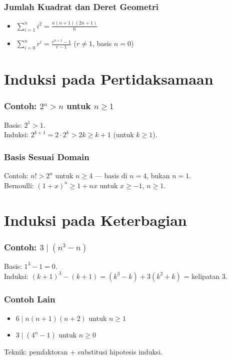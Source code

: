 \documentclass[handout]{beamer}
\theoremstyle{definition}
\theoremstyle{example}
\begin{document}
\begin{frame}
\frametitle{Jumlah Kuadrat dan Deret Geometri}
\begin{itemize}
  \item $\displaystyle\sum_{i=1}^{n} i^2 = \frac{n(n+1)(2n+1)}{6}$
  \item $\displaystyle\sum_{i=0}^{n} r^i = \frac{r^{n+1}-1}{r-1}$ ($r \neq 1$, basis $n=0$)
\end{itemize}
\end{frame}

\section{Induksi pada Pertidaksamaan}

\begin{frame}
\frametitle{Contoh: $2^n > n$ untuk $n \geq 1$}
Basis: $2^1 > 1$.\\
Induksi: $2^{k+1} = 2 \cdot 2^k > 2k \geq k+1$ (untuk $k \geq 1$).
\end{frame}

\begin{frame}
\frametitle{Basis Sesuai Domain}
Contoh: $n! > 2^n$ untuk $n \geq 4$ --- basis di $n=4$, bukan $n=1$.\\
Bernoulli: $(1+x)^n \geq 1+nx$ untuk $x \geq -1$, $n \geq 1$.
\end{frame}

\section{Induksi pada Keterbagian}

\begin{frame}
\frametitle{Contoh: $3 \mid (n^3 - n)$}
Basis: $1^3-1=0$.\\
Induksi: $(k+1)^3-(k+1) = (k^3-k) + 3(k^2+k)$ = kelipatan 3.
\end{frame}

\begin{frame}
\frametitle{Contoh Lain}
\begin{itemize}
  \item $6 \mid n(n+1)(n+2)$ untuk $n \geq 1$
  \item $3 \mid (4^n - 1)$ untuk $n \geq 0$
\end{itemize}
Teknik: pemfaktoran + substitusi hipotesis induksi.
\end{frame}
\end{document}
